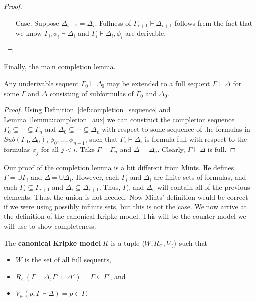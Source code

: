 \documentclass{article}
\begin{document}
\begin{proof}
\begin{itemize}
\begin{itemize}
\begin{itemize}
      \item[Case.] Suppose $\Delta_{i+1} = \Delta_{i}$.  Fullness of $\Gamma_{i+1} \vdash \Delta_{i+1}$
        follows from the fact that we know $\Gamma_i,\phi_i \vdash \Delta_i$ and
        $\Gamma_i \vdash \Delta_i,\phi_i$ are derivable.  
      \end{itemize}

    \end{itemize}

  \end{itemize}

\end{proof}
\noindent
Finally, the main completion lemma.
\begin{lemma}[Completion]
  \label{lemma:completion}
  Any underivable sequent $\Gamma_0 \vdash \Delta_0$ may be extended to a full sequent
  $\Gamma \vdash \Delta$ for some $\Gamma$ and $\Delta$ consisting of subformulas of 
  $\Gamma_0$ and $\Delta_0$.
\end{lemma}
\begin{proof}
  Using Definition~\ref{def:completion_sequence} and Lemma~\ref{lemma:completion_aux} we 
  can construct the completion sequence $\Gamma_0 \subseteq \cdots \subseteq \Gamma_n$ and
  $\Delta_0 \subseteq \cdots \subseteq \Delta_n$ with respect to some sequence of
  the formulas in $Sub(\Gamma_0,\Delta_0)$, $\phi_0,\ldots ,\phi_{n-1}$, such that 
  $\Gamma_i \vdash \Delta_i$ is formula full with respect to the formulas $\phi_j$ for all
  $j < i$.  Take $\Gamma = \Gamma_n$ and $\Delta = \Delta_n$.  
  Clearly, $\Gamma \vdash \Delta$ is full.  
\end{proof}

Our proof of the completion lemma is a bit different from Mints.  He defines $\Gamma = \cup \Gamma_i$ and
$\Delta = \cup\Delta_i$.  However, each $\Gamma_i$ and $\Delta_i$ are finite sets of formulas, and 
each $\Gamma_i \subseteq \Gamma_{i+1}$ and $\Delta_i \subseteq \Delta_{i+1}$.  Thus, $\Gamma_n$ and
$\Delta_n$ will contain all of the previous elements.  Thus, the union is not needed. Now Mints' definition
would be correct if we were using possibly infinite sets, but this is not the case.
We now arrive at the definition of the canonical Kripke model. This
will be the counter model we will use to show completeness.

\begin{definition}
  \label{def:canon_model}
  The \textbf{canonical Kripke model} $K$ is a tuple $\langle W, R_\subseteq, V_{\in} \rangle$
  such that 
  \begin{center}
    \begin{itemize}
    \item $W$ is the set of all full sequents,
    \item $R_\subset(\Gamma \vdash \Delta,\Gamma' \vdash \Delta') = \Gamma \subseteq \Gamma'$, and
    \item $V_\in(p, \Gamma \vdash \Delta) = p \in \Gamma$.
    \end{itemize}
  \end{center}
\end{definition}
\end{document}
